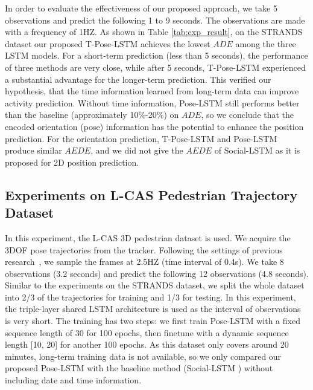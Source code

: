 \documentclass[letterpaper, 10 pt, conference]{ieeeconf}  %
\newcommand\kevinupdate[1]{\textcolor{black}{#1}}
\begin{document}
In order to evaluate the effectiveness of our proposed approach, we take 5 observations and predict the following 1 to 9 seconds. The observations are made with a frequency of 1HZ. As shown in Table \ref{tab:exp_result}, on the STRANDS dataset our proposed T-Pose-LSTM achieves the lowest $ADE$ among the three LSTM models. For a short-term prediction (less than 5 seconds), the performance of three methods are very close, while after 5 seconds, T-Pose-LSTM experienced a substantial advantage for the longer-term prediction. This verified our hypothesis, that the time information learned from long-term data can improve activity prediction. Without time information, Pose-LSTM still performs better than the baseline (approximately 10\%-20\%) on $ADE$, so we conclude that the encoded orientation (pose) information has the potential to enhance the position prediction. For the orientation prediction, T-Pose-LSTM and Pose-LSTM produce similar $AEDE$, and we did not give the $AEDE$ of Social-LSTM as it is proposed for 2D position prediction. 

\subsection{Experiments on L-CAS Pedestrian Trajectory Dataset}\label{sec:exp2}

In this experiment, the L-CAS 3D pedestrian dataset is used. We acquire the 3DOF pose trajectories from the tracker. Following the settings of previous research~\cite{UCY, ETH,social-lstm,context-lstm,SDD}, we sample the frames at 2.5HZ (time interval of 0.4s). We take 8 observations (3.2 seconds) and predict the following 12 observations (4.8 seconds). Similar to the experiments on the STRANDS dataset, we split the whole dataset into 2/3 of the trajectories for training and 1/3 for testing. In this experiment, the triple-layer shared LSTM architecture is used as the interval of observations is very short. 
The training has two steps: we first train Pose-LSTM with a fixed sequence length of 30 for 100 epochs, then finetune with a dynamic sequence length [10, 20] for another 100 epochs. As this dataset only covers around 20 minutes, long-term training data is not available, so we only compared our proposed Pose-LSTM with the baseline method (Social-LSTM \cite{social-lstm}) without including date and time information.
\end{document}
